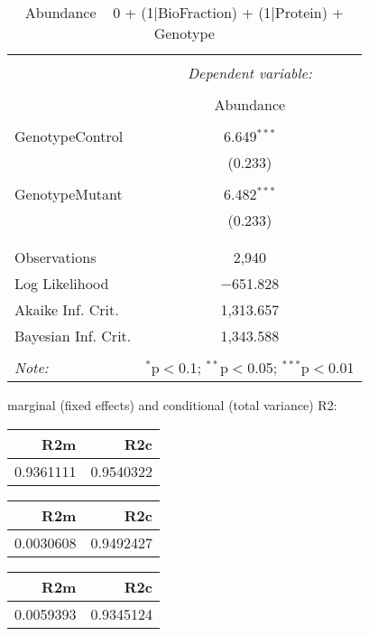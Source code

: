 \documentclass[11pt]{report}
\begin{document}
\begin{table}[!htbp] \centering 
  \caption{Abundance ~ 0 + (1|BioFraction) + (1|Protein) + Genotype} 
  \label{} 
\begin{tabular}{@{\extracolsep{5pt}}lc} 
\\[-1.8ex]\hline 
\hline \\[-1.8ex] 
 & \multicolumn{1}{c}{\textit{Dependent variable:}} \\ 
\cline{2-2} 
\\[-1.8ex] & Abundance \\ 
\hline \\[-1.8ex] 
 GenotypeControl & 6.649$^{***}$ \\ 
  & (0.233) \\ 
  & \\ 
 GenotypeMutant & 6.482$^{***}$ \\ 
  & (0.233) \\ 
  & \\ 
\hline \\[-1.8ex] 
Observations & 2,940 \\ 
Log Likelihood & $-$651.828 \\ 
Akaike Inf. Crit. & 1,313.657 \\ 
Bayesian Inf. Crit. & 1,343.588 \\ 
\hline 
\hline \\[-1.8ex] 
\textit{Note:}  & \multicolumn{1}{r}{$^{*}$p$<$0.1; $^{**}$p$<$0.05; $^{***}$p$<$0.01} \\ 
\end{tabular} 
\end{table} 
marginal (fixed effects) and conditional (total variance) R2:

\begin{tabular}{r|r}
\hline
R2m & R2c\\
\hline
0.9361111 & 0.9540322\\
\hline
\end{tabular}

\begin{tabular}{r|r}
\hline
R2m & R2c\\
\hline
0.0030608 & 0.9492427\\
\hline
\end{tabular}

\begin{tabular}{r|r}
\hline
R2m & R2c\\
\hline
0.0059393 & 0.9345124\\
\hline
\end{tabular}
\end{document}
